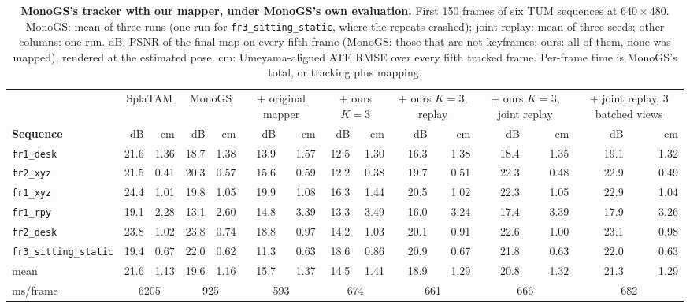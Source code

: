 \begin{table}[t]
\centering
\scriptsize\setlength{\tabcolsep}{2.5pt}
\begin{tabular}{lrrrrrrrrrrrrrr}
\toprule
& \multicolumn{2}{c}{SplaTAM} & \multicolumn{2}{c}{MonoGS} & \multicolumn{2}{c}{+ original mapper} & \multicolumn{2}{c}{+ ours $K{=}3$} & \multicolumn{2}{c}{+ ours $K{=}3$, replay} & \multicolumn{2}{c}{+ ours $K{=}3$, joint replay} & \multicolumn{2}{c}{+ joint replay, 3 batched views} \\
\cmidrule(lr){2-3}\cmidrule(lr){4-5}\cmidrule(lr){6-7}\cmidrule(lr){8-9}\cmidrule(lr){10-11}\cmidrule(lr){12-13}\cmidrule(lr){14-15}
\textbf{Sequence} & dB & cm & dB & cm & dB & cm & dB & cm & dB & cm & dB & cm & dB & cm \\
\midrule
\texttt{fr1\_desk} & 21.6 & 1.36 & 18.7 & 1.38 & 13.9 & 1.57 & 12.5 & 1.30 & 16.3 & 1.38 & 18.4 & 1.35 & 19.1 & 1.32 \\
\texttt{fr2\_xyz} & 21.5 & 0.41 & 20.3 & 0.57 & 15.6 & 0.59 & 12.2 & 0.38 & 19.7 & 0.51 & 22.3 & 0.48 & 22.9 & 0.49 \\
\texttt{fr1\_xyz} & 24.4 & 1.01 & 19.8 & 1.05 & 19.9 & 1.08 & 16.3 & 1.44 & 20.5 & 1.02 & 22.3 & 1.05 & 22.9 & 1.04 \\
\texttt{fr1\_rpy} & 19.1 & 2.28 & 13.1 & 2.60 & 14.8 & 3.39 & 13.3 & 3.49 & 16.0 & 3.24 & 17.4 & 3.39 & 17.9 & 3.26 \\
\texttt{fr2\_desk} & 23.8 & 1.02 & 23.8 & 0.74 & 18.8 & 0.97 & 14.2 & 1.03 & 20.1 & 0.91 & 22.6 & 1.00 & 23.1 & 0.98 \\
\texttt{fr3\_sitting\_static} & 19.4 & 0.67 & 22.0 & 0.62 & 11.3 & 0.63 & 18.6 & 0.86 & 20.9 & 0.67 & 21.8 & 0.63 & 22.0 & 0.63 \\
\midrule
mean & 21.6 & 1.13 & 19.6 & 1.16 & 15.7 & 1.37 & 14.5 & 1.41 & 18.9 & 1.29 & 20.8 & 1.32 & 21.3 & 1.29 \\
ms/frame & \multicolumn{2}{c}{6205} & \multicolumn{2}{c}{925} & \multicolumn{2}{c}{593} & \multicolumn{2}{c}{674} & \multicolumn{2}{c}{661} & \multicolumn{2}{c}{666} & \multicolumn{2}{c}{682} \\
\bottomrule
\end{tabular}
\caption{\textbf{MonoGS's tracker with our mapper, under MonoGS's own evaluation.} First 150 frames of six TUM sequences at $640{\times}480$. MonoGS: mean of three runs (one run for \texttt{fr3\_sitting\_static}, where the repeats crashed); joint replay: mean of three seeds; other columns: one run. dB: PSNR of the final map on every fifth frame (MonoGS: those that are not keyframes; ours: all of them, none was mapped), rendered at the estimated pose. cm: Umeyama-aligned ATE RMSE over every fifth tracked frame. Per-frame time is MonoGS's total, or tracking plus mapping.}
\label{tab:hybrid}
\end{table}
